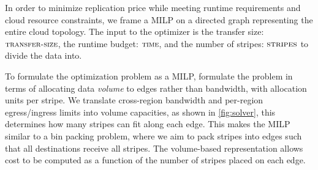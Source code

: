 

In order to minimize replication price while meeting runtime requirements and cloud resource constraints, we frame a MILP on a directed graph representing the entire cloud topology. The input to the optimizer is the transfer size: $\small{\textsc{transfer-size}}$, the runtime budget: $\small{\textsc{time}}$, and the number of stripes: $\textsc{stripes}$ to divide the data into.

%

To formulate the optimization problem as a MILP, formulate the problem in terms of allocating data \textit{volume} to edges rather than bandwidth, with allocation units per stripe. We translate cross-region bandwidth and per-region egress/ingress limits into volume capacities, as shown in \cref{fig:solver}, this determines how many stripes can fit along each edge. This makes the MILP similar to a bin packing problem, where we aim to pack stripes into edges such that all destinations receive all stripes. 
The volume-based representation allows cost to be computed as a function of the number of stripes placed on each edge. 

